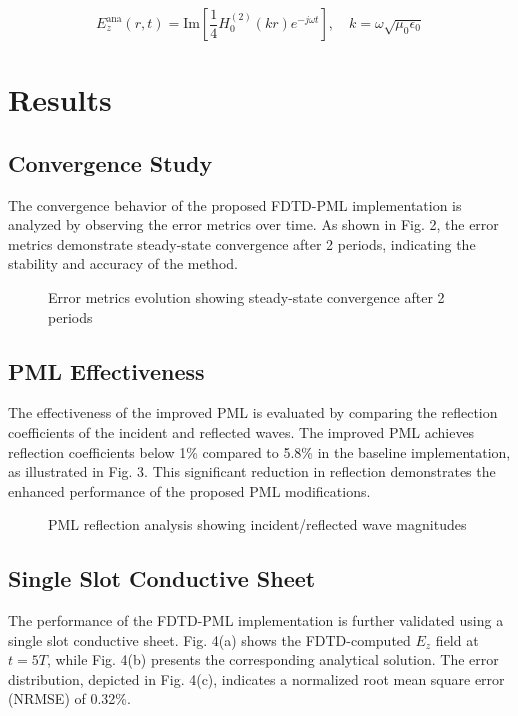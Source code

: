 \documentclass[journal]{IEEEtran}
\begin{document}
\begin{equation}
E_z^{\text{ana}}(r,t) = \text{Im}\left[\frac{1}{4}H_0^{(2)}(kr)e^{-j\omega t}\right],\quad k = \omega\sqrt{\mu_0\epsilon_0}
\end{equation}

\section{Results}
\subsection{Convergence Study}
The convergence behavior of the proposed FDTD-PML implementation is analyzed by observing the error metrics over time. As shown in Fig. 2, the error metrics demonstrate steady-state convergence after 2 periods, indicating the stability and accuracy of the method.

\begin{figure}[htbp]
\centering
\caption{Error metrics evolution showing steady-state convergence after 2 periods}
\end{figure}

\subsection{PML Effectiveness}
The effectiveness of the improved PML is evaluated by comparing the reflection coefficients of the incident and reflected waves. The improved PML achieves reflection coefficients below 1\% compared to 5.8\% in the baseline implementation, as illustrated in Fig. 3. This significant reduction in reflection demonstrates the enhanced performance of the proposed PML modifications.

\begin{figure}[htbp]
\centering
\caption{PML reflection analysis showing incident/reflected wave magnitudes}
\end{figure}

\subsection{Single Slot Conductive Sheet}
The performance of the FDTD-PML implementation is further validated using a single slot conductive sheet. Fig. 4(a) shows the FDTD-computed $E_z$ field at $t=5T$, while Fig. 4(b) presents the corresponding analytical solution. The error distribution, depicted in Fig. 4(c), indicates a normalized root mean square error (NRMSE) of 0.32\%.
\end{document}
